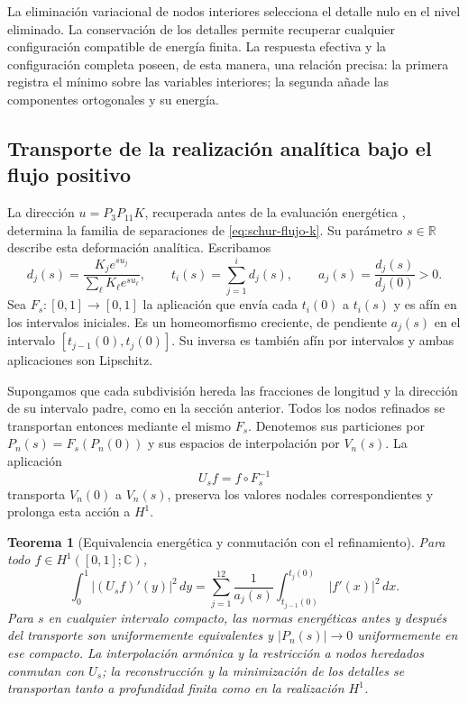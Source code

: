 \documentclass[a4paper,10pt]{article}
\newtheorem{theorem}{Teorema}[section]
\theoremstyle{definition}\newtheorem{definition}[theorem]{Definición}
\theoremstyle{remark}\newtheorem{remark}[theorem]{Observación}
\numberwithin{equation}{section}
\begin{document}
La eliminación variacional de nodos interiores selecciona el detalle
nulo en el nivel eliminado. La conservación de los detalles permite
recuperar cualquier configuración compatible de energía finita. La
respuesta efectiva y la configuración completa poseen, de esta manera,
una relación precisa: la primera registra el mínimo sobre las variables
interiores; la segunda añade las componentes ortogonales y su energía.

\subsection{Transporte de la realización analítica bajo el flujo positivo}

La dirección \(u=P_3P_{11}K\), recuperada antes de la evaluación
energética \cite{hmtX}, determina la familia de separaciones de
\eqref{eq:schur-flujo-k}. Su parámetro \(s\in\mathbb R\)
describe esta deformación analítica. Escribamos
\[
 d_j(s)=\frac{K_je^{su_j}}{\sum_\ell K_\ell e^{su_\ell}},
 \qquad
 t_i(s)=\sum_{j=1}^id_j(s),
 \qquad
 a_j(s)=\frac{d_j(s)}{d_j(0)}>0.
\]
Sea \(F_s:[0,1]\to[0,1]\) la aplicación que envía cada
\(t_i(0)\) a \(t_i(s)\) y es afín en los intervalos iniciales.
Es un homeomorfismo creciente, de pendiente \(a_j(s)\) en el
intervalo \([t_{j-1}(0),t_j(0)]\). Su inversa es también afín
por intervalos y ambas aplicaciones son Lipschitz.

Supongamos que cada subdivisión hereda las fracciones de longitud y la
dirección de su intervalo padre, como en la sección anterior. Todos
los nodos refinados se transportan entonces mediante el mismo \(F_s\).
Denotemos sus particiones por \(P_n(s)=F_s(P_n(0))\) y sus
espacios de interpolación por \(V_n(s)\). La aplicación
\[
 U_s f=f\circ F_s^{-1}
\]
transporta \(V_n(0)\) a \(V_n(s)\), preserva los valores
nodales correspondientes y prolonga esta acción a \(H^1\).

\begin{theorem}[Equivalencia energética y conmutación con el refinamiento]
\label{thm:transporte-h1-flujo-k}
Para todo \(f\in H^1([0,1];\mathbb C)\),
\begin{equation}
 \int_0^1|(U_sf)'(y)|^2\,dy
 =\sum_{j=1}^{12}\frac1{a_j(s)}
 \int_{t_{j-1}(0)}^{t_j(0)}|f'(x)|^2\,dx.
 \label{eq:transporte-energia-h1-k}
\end{equation}
Para \(s\) en cualquier intervalo compacto, las normas energéticas
antes y después del transporte son uniformemente equivalentes y
\(|P_n(s)|\to0\) uniformemente en ese compacto. La interpolación
armónica y la restricción a nodos heredados conmutan con \(U_s\);
la reconstrucción y la minimización de los detalles se transportan
tanto a profundidad finita como en la realización \(H^1\).
\end{theorem}
\end{document}
